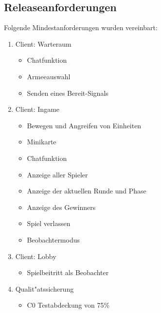 \documentclass[12pt, titlepage]{scrartcl}
\begin{document}
        \subsection{Releaseanforderungen} \label{FEATURE_REQUESTS}
            Folgende Mindestanforderungen wurden vereinbart:
            \begin{enumerate}
                \item Client: Warteraum
                \begin{itemize}
                    \item Chatfunktion
                    \item Armeeauswahl
                    \item Senden eines Bereit-Signals
                \end{itemize}
                \item Client: Ingame
                \begin{itemize}
                    \item Bewegen und Angreifen von Einheiten
                    \item Minikarte
                    \item Chatfunktion
                    \item Anzeige aller Spieler
                    \item Anzeige der aktuellen Runde und Phase
                    \item Anzeige des Gewinners
 					\item Spiel verlassen
			\item Beobachtermodus
                \end{itemize}
                \item Client: Lobby
                \begin{itemize}
                    \item Spielbeitritt als Beobachter
                \end{itemize}
                \item Qualit"atssicherung
                \begin{itemize}
                    \item C0 Testabdeckung von 75\%
                \end{itemize}
            \end{enumerate}
\end{document}
